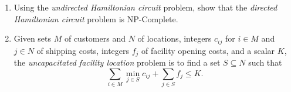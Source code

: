 \documentclass[12pt]{article}
\newcommand{\NP}{\begin{math}{\cal N}{\cal P}\end{math}}
\begin{document}
\begin{enumerate}
  \item Using the {\em undirected Hamiltonian circuit} problem,
  show that the {\em directed Hamiltonian circuit} problem is NP-Complete.
\item Given sets $M$ of customers and $N$ of locations,
integers $c_{ij}$ for $i \in M$ and $j \in N$ of shipping costs,
integers $f_j$ of facility opening costs,
and a scalar $K$,
the {\em uncapacitated facility location} problem is to find
a set $S \subseteq N$ such that
\begin{displaymath}
\sum_{i \in M} \min_{j \in S} c_{ij} + \sum_{j \in S} f_j  \leq K.

\end{displaymath}
\end{enumerate}
\end{document}
